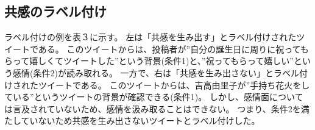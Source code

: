 \documentclass[dvipdfmx]{issj}
\begin{document}
\subsection{共感のラベル付け  }  %
ラベル付けの例を表３に示す。
左は「共感を生み出す」とラベル付けされたツイートである。
このツイートからは、投稿者が”自分の誕生日に周りに祝ってもらって嬉しくてツイートした”という背景(条件1)と、”祝ってもらって嬉しい”という感情(条件2)が読み取れる。
一方で、右は「共感を生み出さない」とラベル付けされたツイートである。
このツイートからは、吉高由里子が”手持ち花火をしている”というツイートの背景が確認できる(条件1)。
しかし、感情面については言及されていないため、感情を汲み取ることはできない。
つまり、条件2を満たしていないため共感を生み出さないツイートとラベル付けした。
\end{document}
